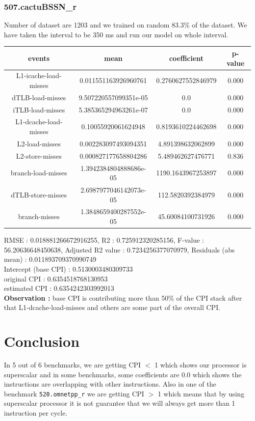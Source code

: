 \documentclass[10pt, letterpaper, IEEEtran, tikz,border=5,a4paper,fleqn]{article}
\begin{document}
\subsubsection{507.cactuBSSN\_r}

Number of dataset are 1203 and we trained on random 83.3\% of the dataset. We have taken the interval to be 350 ms and run our model on whole interval.
\begin{center}
\begin{tabular}{||c c c c||}
 \hline
 \textbf{events} & \textbf{mean} & \textbf{coefficient} & \textbf{p-value}\\ [0.5ex]
 \hline\hline
 L1-icache-load-misses & 0.011551163926960761 & 0.2760627552846979 & 0.000\\
 \hline
 dTLB-load-misses & 9.507220557099351e-05 & 0.0 & 0.000\\
 \hline
 iTLB-load-misses & 5.385365294963261e-07 & 0.0 & 0.000\\
 \hline
 L1-dcache-load-misses & 0.10055920061624948 & 0.8193610224462698 & 0.000\\
 \hline
 L2-load-misses & 0.002283097493094351 & 4.891398632062899 & 0.000\\
 \hline
 L2-store-misses & 0.000827177658804286 & 5.489462627476771 & 0.836\\
 \hline
 branch-load-misses & 1.3942384804888686e-05 & 1190.1643967253897 & 0.000\\
 \hline
 dTLB-store-misses & 2.6987977046142073e-05 & 112.5820392384979 & 0.000\\
 \hline
 branch-misses & 1.3848659400287552e-05 & 45.60084100731926 & 0.000\\
 \hline
\end{tabular}
\end{center}
RMSE : 0.018881266672916255,
R2 : 0.725912320285156,
F-value : 56.20636648450638,
Adjusted R2 value : 0.7234256377070979,
Residuals (abs mean) : 0.011893709370990749\\

\noindent Intercept (base CPI) : 0.5130003480309733\\
original CPI : 0.6354518768130953\\
estimated CPI : 0.6354242303992013\\

\noindent \textbf{Observation :} base CPI is contributing more than 50\% of the CPI stack after that L1-dcache-load-misses and others are some part of the overall CPI.

\section{Conclusion}

In 5 out of 6 benchmarks, we are getting CPI $<$ 1 which shows our processor is superscalar and in some benchmarks, some coefficients are 0.0 which shows the instructions are overlapping with other instructions. Also in one of the benchmark \verb|520.omnetpp_r| we are getting CPI $>$ 1 which means that by using superscalar processor it is not guarantee that we will always get more than 1 instruction per cycle.
\end{document}
